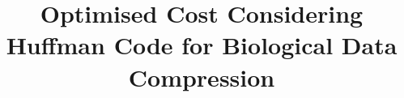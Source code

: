 \documentclass[preprint,12pt]{elsarticle}
\begin{document}
\begin{frontmatter}



\title{Optimised Cost Considering Huffman Code for Biological Data Compression}


\author{}

\address{}


\end{frontmatter}
\end{document}
